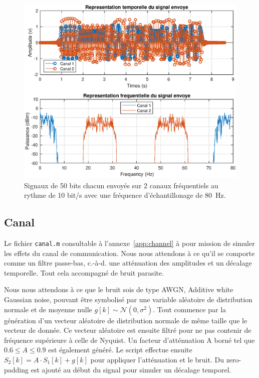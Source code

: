 \documentclass[10pt, oneside, a4paper]{article}
\begin{document}
\begin{figure}[htbp]
	\includegraphics[width=\textwidth]{eps/sender.eps}
	\caption{Signaux de 50 bits chacun envoyés sur 2 canaux fréquentiels au rythme de 10 bit/s
			 avec une fréquence d'échantillonage de \SI{80}{\hertz}.}
	\label{fig:sender}
\end{figure}

\subsection{Canal}
Le fichier \texttt{canal.m} consultable à l'annexe~\ref{app:channel} à pour mission de simuler les effets du canal de communication.
Nous nous attendons à ce qu'il se comporte comme un filtre passe-bas, c.-à-d. une atténuation des amplitudes et un décalage temporelle.
Tout cela accompagné de bruit parasite.

Nous nous attendons à ce que le bruit sois de type AWGN, Additive white Gaussian noise, pouvant être symbolisé par une variable aléatoire de distribution normale et de moyenne nulle $g[k]\sim\mathcal{N}(0,\sigma^2)$.
Tout commence par la génération d'un vecteur aléatoire de distribution normale de même taille que le vecteur de donnée.
Ce vecteur aléatoire est ensuite filtré pour ne pas contenir de fréquence supérieure à celle de Nyquist.
Un facteur d'atténuation A borné tel que $\num{0.6} \leq A \leq \num{0.9}$ est également généré.
Le script effectue ensuite $S_2[k] = A \cdot S_1[k] + g[k]$ pour appliquer l'atténuation et le bruit.
Du \og{}zero-padding\fg{} est ajouté au début du signal pour simuler un décalage temporel.
\end{document}
